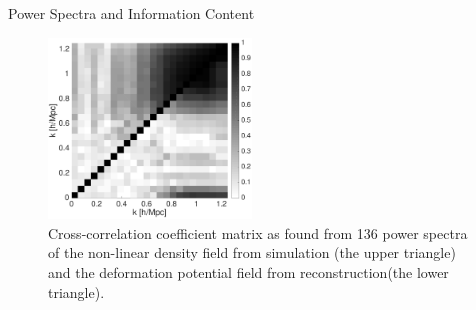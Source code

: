 \begin{section}{Power Spectra and Information Content}
\begin{figure}
  \includegraphics[width=0.48\textwidth]{corr_cut-crop.pdf}
  \caption{Cross-correlation coefficient matrix as found from 136 power spectra of the non-linear 
density field from simulation (the upper triangle) and the deformation potential field from 
reconstruction(the lower triangle).}   


\end{figure}
\end{section}
